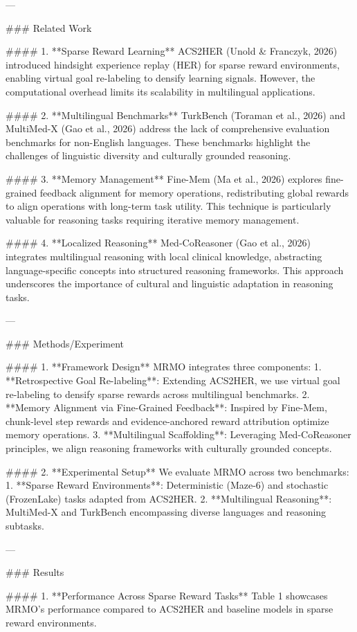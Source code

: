 ---

### Related Work

#### 1. **Sparse Reward Learning**
ACS2HER (Unold & Franczyk, 2026) introduced hindsight experience replay (HER) for sparse reward environments, enabling virtual goal re-labeling to densify learning signals. However, the computational overhead limits its scalability in multilingual applications.

#### 2. **Multilingual Benchmarks**
TurkBench (Toraman et al., 2026) and MultiMed-X (Gao et al., 2026) address the lack of comprehensive evaluation benchmarks for non-English languages. These benchmarks highlight the challenges of linguistic diversity and culturally grounded reasoning.

#### 3. **Memory Management**
Fine-Mem (Ma et al., 2026) explores fine-grained feedback alignment for memory operations, redistributing global rewards to align operations with long-term task utility. This technique is particularly valuable for reasoning tasks requiring iterative memory management.

#### 4. **Localized Reasoning**
Med-CoReasoner (Gao et al., 2026) integrates multilingual reasoning with local clinical knowledge, abstracting language-specific concepts into structured reasoning frameworks. This approach underscores the importance of cultural and linguistic adaptation in reasoning tasks.

---

### Methods/Experiment

#### 1. **Framework Design**
MRMO integrates three components:
1. **Retrospective Goal Re-labeling**: Extending ACS2HER, we use virtual goal re-labeling to densify sparse rewards across multilingual benchmarks.
2. **Memory Alignment via Fine-Grained Feedback**: Inspired by Fine-Mem, chunk-level step rewards and evidence-anchored reward attribution optimize memory operations.
3. **Multilingual Scaffolding**: Leveraging Med-CoReasoner principles, we align reasoning frameworks with culturally grounded concepts.

#### 2. **Experimental Setup**
We evaluate MRMO across two benchmarks:
1. **Sparse Reward Environments**: Deterministic (Maze-6) and stochastic (FrozenLake) tasks adapted from ACS2HER.
2. **Multilingual Reasoning**: MultiMed-X and TurkBench encompassing diverse languages and reasoning subtasks.

---

### Results

#### 1. **Performance Across Sparse Reward Tasks**
Table 1 showcases MRMO's performance compared to ACS2HER and baseline models in sparse reward environments.

